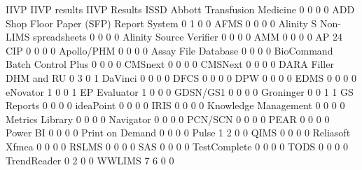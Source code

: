 \documentclass{article}
\begin{document}
\begin{Schunk}
\begin{Soutput}
                                           IIVP IIVP results IIVP Results ISSD
  Abbott Transfusion Medicine                 0            0            0    0
  ADD Shop Floor Paper (SFP) Report System    0            1            0    0
  AFMS                                        0            0            0    0
  Alinity S Non-LIMS spreadsheets             0            0            0    0
  Alinity Source Verifier                     0            0            0    0
  AMM                                         0            0            0    0
  AP 24 CIP                                   0            0            0    0
  Apollo/PHM                                  0            0            0    0
  Assay File Database                         0            0            0    0
  BioCommand Batch Control Plus               0            0            0    0
  CMSnext                                     0            0            0    0
  CMSNext                                     0            0            0    0
  DARA Filler DHM and RU                      0            3            0    1
  DaVinci                                     0            0            0    0
  DFCS                                        0            0            0    0
  DPW                                         0            0            0    0
  EDMS                                        0            0            0    0
  eNovator                                    1            0            0    1
  EP Evaluator                                1            0            0    0
  GDSN/GS1                                    0            0            0    0
  Groninger                                   0            0            1    1
  GS Reports                                  0            0            0    0
  ideaPoint                                   0            0            0    0
  IRIS                                        0            0            0    0
  Knowledge Management                        0            0            0    0
  Metrics Library                             0            0            0    0
  Navigator                                   0            0            0    0
  PCN/SCN                                     0            0            0    0
  PEAR                                        0            0            0    0
  Power BI                                    0            0            0    0
  Print on Demand                             0            0            0    0
  Pulse                                       1            2            0    0
  QIMS                                        0            0            0    0
  Reliasoft Xfmea                             0            0            0    0
  RSLMS                                       0            0            0    0
  SAS                                         0            0            0    0
  TestComplete                                0            0            0    0
  TODS                                        0            0            0    0
  TrendReader                                 0            2            0    0
  WWLIMS                                      7            6            0    0
                                          

\end{Soutput}
\end{Schunk}
\end{document}
